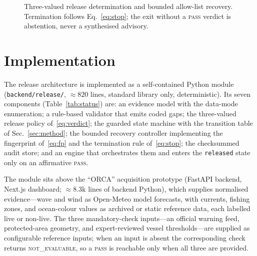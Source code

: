 \documentclass[conference]{IEEEtran}
\newcommand{\NE}{\textsc{not\_evaluable}}
\newcommand{\PASS}{\textsc{pass}}
\begin{document}
\begin{figure}[t]
\centering
{}
\caption{Three-valued release determination and bounded allow-list recovery. Termination follows Eq.~\eqref{eq:stop}; the exit without a \PASS{} verdict is abstention, never a synthesised advisory.}
\label{fig:flow}
\end{figure}

\section{Implementation}
\label{sec:impl}
The release architecture is implemented as a self-contained Python module (\texttt{backend/release/}, ${\approx}820$ lines, standard library only, deterministic). Its seven components (Table~\ref{tab:status}) are: an evidence model with the data-mode enumeration; a rule-based validator that emits coded gaps; the three-valued release policy of~\eqref{eq:verdict}; the guarded state machine with the transition table of Sec.~\ref{sec:method}; the bounded recovery controller implementing the fingerprint of~\eqref{eq:fp} and the termination rule of~\eqref{eq:stop}; the checksummed audit store; and an engine that orchestrates them and enters the \texttt{released} state only on an affirmative \PASS{}.

The module sits above the ``ORCA'' acquisition prototype (FastAPI backend, Next.js dashboard; ${\approx}8.3$k lines of backend Python), which supplies normalised evidence---wave and wind as Open-Meteo model forecasts, with currents, fishing zones, and ocean-colour values as archived or static reference data, each labelled live or non-live. The three mandatory-check inputs---an official warning feed, protected-area geometry, and expert-reviewed vessel thresholds---are supplied as configurable reference inputs; when an input is absent the corresponding check returns \NE{}, so a \PASS{} is reachable only when all three are provided.
\end{document}
